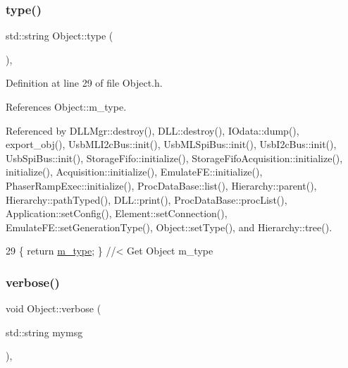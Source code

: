 \subsubsection{\texorpdfstring{type()}{type()}}
{\footnotesize\ttfamily std\+::string Object\+::type (\begin{DoxyParamCaption}{ }\end{DoxyParamCaption})\hspace{0.3cm}{\ttfamily [inline]}, {\ttfamily [inherited]}}



Definition at line 29 of file Object.\+h.



References Object\+::m\+\_\+type.



Referenced by D\+L\+L\+Mgr\+::destroy(), D\+L\+L\+::destroy(), I\+Odata\+::dump(), export\+\_\+obj(), Usb\+M\+L\+I2c\+Bus\+::init(), Usb\+M\+L\+Spi\+Bus\+::init(), Usb\+I2c\+Bus\+::init(), Usb\+Spi\+Bus\+::init(), Storage\+Fifo\+::initialize(), Storage\+Fifo\+Acquisition\+::initialize(), initialize(), Acquisition\+::initialize(), Emulate\+F\+E\+::initialize(), Phaser\+Ramp\+Exec\+::initialize(), Proc\+Data\+Base\+::list(), Hierarchy\+::parent(), Hierarchy\+::path\+Typed(), D\+L\+L\+::print(), Proc\+Data\+Base\+::proc\+List(), Application\+::set\+Config(), Element\+::set\+Connection(), Emulate\+F\+E\+::set\+Generation\+Type(), Object\+::set\+Type(), and Hierarchy\+::tree().


\begin{DoxyCode}
29 \{ \textcolor{keywordflow}{return} \hyperlink{classObject_a457a600fe8c00eb1034374f75110a78c}{m\_type};       \} \textcolor{comment}{//< Get Object m\_type}
\end{DoxyCode}
\mbox{\label{classObject_a83d2db2df682907ea1115ad721c1c4a1}} 
\subsubsection{\texorpdfstring{verbose()}{verbose()}\hspace{0.1cm}{\footnotesize\ttfamily [1/2]}}
{\footnotesize\ttfamily void Object\+::verbose (\begin{DoxyParamCaption}\item[{std\+::string}]{mymsg }\end{DoxyParamCaption})\hspace{0.3cm}{\ttfamily [inline]}, {\ttfamily [inherited]}}



